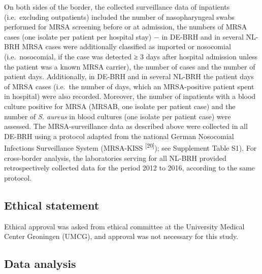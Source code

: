 \documentclass[
]{book}
\begin{document}
On both sides of the border, the collected surveillance data of inpatients (i.e.~excluding outpatients) included the number of nasopharyngeal swabs performed for MRSA screening before or at admission, the numbers of MRSA cases (one isolate per patient per hospital stay) − in DE-BRH and in several NL-BRH MRSA cases were additionally classified as imported or nosocomial (i.e.~nosocomial, if the case was detected ≥ 3 days after hospital admission unless the patient was a known MRSA carrier), the number of cases and the number of patient days. Additionally, in DE-BRH and in several NL-BRH the patient days of MRSA cases (i.e.~the number of days, which an MRSA-positive patient spent in hospital) were also recorded. Moreover, the number of inpatients with a blood culture positive for MRSA (MRSAB, one isolate per patient case) and the number of \emph{S. aureus} in blood cultures (one isolate per patient case) were assessed. The MRSA-surveillance data as described above were collected in all DE-BRH using a protocol adapted from the national German Nosocomial Infections Surveillance System (MRSA-KISS \textsuperscript{{[}20{]}}); see Supplement Table S1). For cross-border analysis, the laboratories serving for all NL-BRH provided retrospectively collected data for the period 2012 to 2016, according to the same protocol.

\hypertarget{ethical-statement}{%
\subsection{Ethical statement}\label{ethical-statement}}

Ethical approval was asked from ethical committee at the University Medical Center Groningen (UMCG), and approval was not necessary for this study.

\hypertarget{data-analysis}{%
\subsection{Data analysis}\label{data-analysis}}
\end{document}
